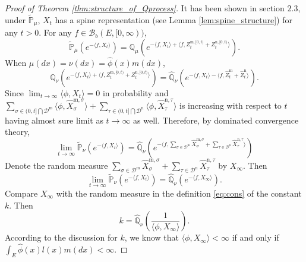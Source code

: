 \documentclass[12pt,a4paper]{amsart}
\numberwithin{equation}{section}
\theoremstyle{plain}
\theoremstyle{definition}
\begin{document}
{%
\begin{proof}[Proof of Theorem \ref{thm:structure_of_Qprocess}]
  It has been shown in section $2.3$, under $\widetilde{\mathbb P}_\mu$,  $X_t$ has a spine representation
  (see Lemma \ref{lem:spine_structure}) for any $t>0$.  For any $f\in\mathcal B_b(E,[0,\infty))$,
  \[
    \widetilde {\mathbb P}_{\mu}\left(e^{-\langle f, X_t\rangle }\right)=\mathbb Q_{\mu}\left(e^{-\langle f, X_t\rangle+\langle f, Z^{{\mathrm m},[0,t)}_t+Z^{{\mathrm n},[0,t)}_t\rangle }\right).
  \]
  When $\mu(dx)=\nu(dx)=\widehat\phi(x)m(dx)$,
  \[
    \mathbb Q_{\nu}\left(e^{-\langle f, X_t\rangle+\langle f, Z^{{\mathrm m},[0,t)}_t+Z^{{\mathrm n},[0,t)}_t\rangle }\right)=\widehat{\mathbb Q}_{\nu}\left(e^{-\langle f, X_t\rangle-\langle f, \widehat Z^{{\mathrm m}}_t+\widehat Z^{{\mathrm n}}_t\rangle }\right).
  \]
  Since $\lim_{t\to\infty}\langle\phi, X_{t}\rangle=0$ in probability and $\sum_{\sigma\in(0, t]\bigcap\mathcal D^{\mathrm m}}\langle \phi, \widehat X_{\sigma}^{{\mathrm m},\sigma}\rangle +\sum_{\tau\in (0, t]\bigcap \mathcal D^{\mathrm n}}\langle \phi, \widehat X_{\tau}^{{\mathrm n},\tau}\rangle $ is increasing with respect to $t$ having almost sure limit as $t\to\infty$ as well.  Therefore, by dominated convergence theory,
  \[
    \lim_{t\to\infty}\widetilde {\mathbb P}_{\nu}\left(e^{-\langle f, X_t\rangle }\right)=\widehat{\mathbb Q}_{\nu}\left(e^{-\langle f,\sum_{\sigma\in\mathcal D^{\mathrm m}}\widehat X^{{\mathrm m},\sigma}_\sigma+\sum_{\tau\in\mathcal D^{\mathrm n}}\widehat X^{{\mathrm n},\tau}_\tau\rangle }\right)
  \]
  Denote the random measure $\sum_{\sigma\in\mathcal D^{\mathrm m}}\widehat X^{{\mathrm m},\sigma}_\sigma+\sum_{\tau\in\mathcal D^{\mathrm n}}\widehat X^{{\mathrm n},\tau}_\tau$ by $X_\infty$.
  Then
  \[
    \lim_{t\to\infty}\widetilde {\mathbb P}_{\nu}\left(e^{-\langle f, X_t\rangle }\right)=\widehat{\mathbb Q}_\nu \left(e^{-\langle f,X_\infty\rangle}\right).
  \]
  Compare $X_\infty$ with the random measure in the definition \eqref{eq:cons} of the constant $k$.  Then
  $$
  k=\widehat{\mathbb Q}_\nu\left(\dfrac{1}{\langle\phi, X_\infty\rangle}\right).
  $$
  According to the discussion for $k$, we know that $\langle\phi, X_\infty\rangle<\infty$ if and only if $\int_E\widehat\phi(x)l(x)m(dx)<\infty$.



\end{proof}}
\end{document}
